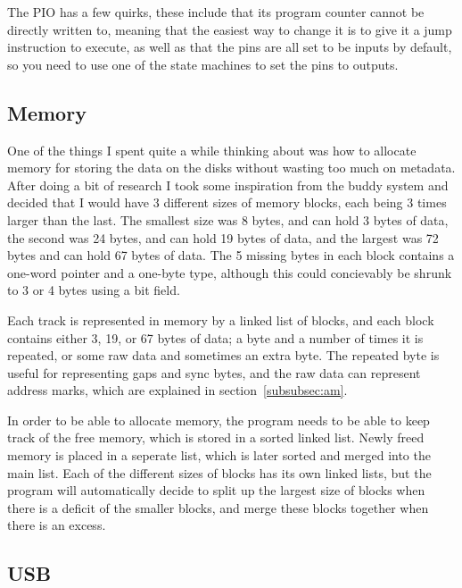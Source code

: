\documentclass[a4paper]{article}
\begin{document}
The PIO has a few quirks, these include that its program counter
cannot be directly written to, meaning that the easiest way to change
it is to give it a jump instruction to execute, as well as that the
pins are all set to be inputs by default, so you need to use one of
the state machines to set the pins to outputs.

\subsection{Memory}

One of the things I spent quite a while thinking about was how to
allocate memory for storing the data on the disks without wasting too
much on metadata. After doing a bit of research I took some
inspiration from the buddy system and decided that I would have 3
different sizes of memory blocks, each being 3 times larger than the
last. The smallest size was 8 bytes, and can hold 3 bytes of data, the
second was 24 bytes, and can hold 19 bytes of data, and the largest
was 72 bytes and can hold 67 bytes of data. The 5 missing bytes in
each block contains a one-word pointer and a one-byte type, although
this could concievably be shrunk to 3 or 4 bytes using a bit field.

Each track is represented in memory by a linked list of blocks, and
each block contains either 3, 19, or 67 bytes of data; a byte and a
number of times it is repeated, or some raw data and sometimes an
extra byte. The repeated byte is useful for representing gaps and sync
bytes, and the raw data can represent address marks, which are
explained in section~\ref{subsubsec:am}.

In order to be able to allocate memory, the program needs to be able
to keep track of the free memory, which is stored in a sorted linked
list. Newly freed memory is placed in a seperate list, which is later
sorted and merged into the main list. Each of the different sizes of
blocks has its own linked lists, but the program will automatically
decide to split up the largest size of blocks when there is a deficit
of the smaller blocks, and merge these blocks together when there is
an excess.

\subsection{USB}
\end{document}
